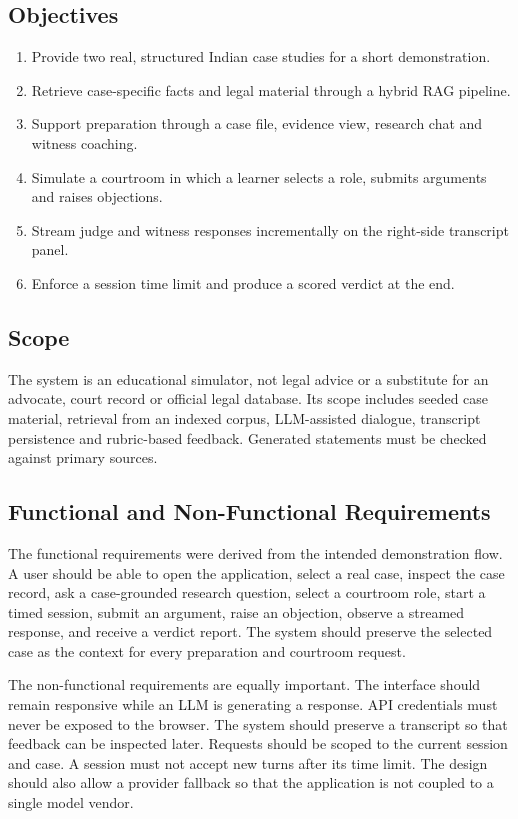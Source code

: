 \documentclass[12pt]{article}
\begin{document}
\subsection{Objectives}
\begin{enumerate}[label=\arabic*.]
\item Provide two real, structured Indian case studies for a short demonstration.
\item Retrieve case-specific facts and legal material through a hybrid RAG pipeline.
\item Support preparation through a case file, evidence view, research chat and witness coaching.
\item Simulate a courtroom in which a learner selects a role, submits arguments and raises objections.
\item Stream judge and witness responses incrementally on the right-side transcript panel.
\item Enforce a session time limit and produce a scored verdict at the end.
\end{enumerate}

\subsection{Scope}
The system is an educational simulator, not legal advice or a substitute for an advocate, court record or official legal database. Its scope includes seeded case material, retrieval from an indexed corpus, LLM-assisted dialogue, transcript persistence and rubric-based feedback. Generated statements must be checked against primary sources.


\subsection{Functional and Non-Functional Requirements}
The functional requirements were derived from the intended demonstration flow. A user should be able to open the application, select a real case, inspect the case record, ask a case-grounded research question, select a courtroom role, start a timed session, submit an argument, raise an objection, observe a streamed response, and receive a verdict report. The system should preserve the selected case as the context for every preparation and courtroom request.

The non-functional requirements are equally important. The interface should remain responsive while an LLM is generating a response. API credentials must never be exposed to the browser. The system should preserve a transcript so that feedback can be inspected later. Requests should be scoped to the current session and case. A session must not accept new turns after its time limit. The design should also allow a provider fallback so that the application is not coupled to a single model vendor.
\end{document}
